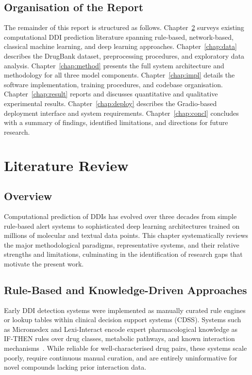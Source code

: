 \documentclass[12pt,a4paper,oneside]{report}
\begin{document}
\section{Organisation of the Report}

The remainder of this report is structured as follows.
Chapter~\ref{chap:lit} surveys existing computational DDI prediction literature spanning
rule-based, network-based, classical machine learning, and deep learning approaches.
Chapter~\ref{chap:data} describes the DrugBank dataset, preprocessing procedures, and
exploratory data analysis.
Chapter~\ref{chap:method} presents the full system architecture and methodology for all
three model components.
Chapter~\ref{chap:impl} details the software implementation, training procedures, and
codebase organisation.
Chapter~\ref{chap:result} reports and discusses quantitative and qualitative experimental
results.
Chapter~\ref{chap:deploy} describes the Gradio-based deployment interface and system
requirements.
Chapter~\ref{chap:concl} concludes with a summary of findings, identified limitations,
and directions for future research.

\chapter{Literature Review}
\label{chap:lit}

\section{Overview}

Computational prediction of DDIs has evolved over three decades from simple rule-based alert
systems to sophisticated deep learning architectures trained on millions of molecular and
textual data points. This chapter systematically reviews the major methodological paradigms,
representative systems, and their relative strengths and limitations, culminating in the
identification of research gaps that motivate the present work.

\section{Rule-Based and Knowledge-Driven Approaches}

Early DDI detection systems were implemented as manually curated rule engines or lookup
tables within clinical decision support systems (CDSS). Systems such as Micromedex and
Lexi-Interact encode expert pharmacological knowledge as IF-THEN rules over drug classes,
metabolic pathways, and known interaction mechanisms~\cite{becker2007hospitalisations}.
While reliable for well-characterised drug pairs, these systems scale poorly, require
continuous manual curation, and are entirely uninformative for novel compounds lacking prior
interaction data.
\end{document}
